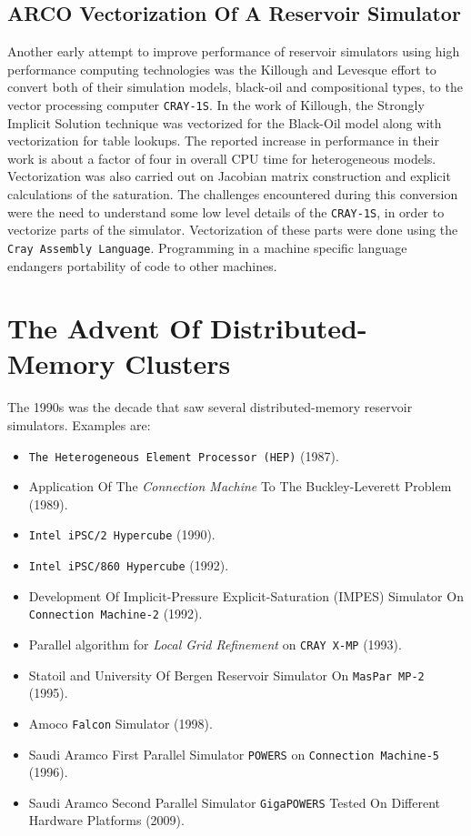 \documentclass[barcolor=BrickRed,nocopyright,nolists]{asmejour}
\begin{document}
\subsection{ARCO Vectorization Of A Reservoir Simulator}
Another early attempt to improve performance of reservoir simulators using high performance computing technologies was the Killough and Levesque\cite{spe10521} effort to convert both of their simulation models, black-oil and compositional types,
to the vector processing computer \texttt{CRAY-1S}. In the work of Killough\cite{spe10521}, the Strongly Implicit Solution technique was vectorized for the Black-Oil model along
with vectorization for table lookups. The reported increase in performance in their work is about a factor of four in overall CPU time for heterogeneous models. Vectorization was also carried out on Jacobian matrix construction and
explicit calculations of the saturation. The challenges encountered during this conversion were the need to understand some low level details of the \texttt{CRAY-1S}, in order to vectorize parts of the simulator. Vectorization of these parts were done
using the \texttt{Cray Assembly Language}. Programming in a machine specific language endangers portability of code to other machines.



\section{The Advent Of Distributed-Memory Clusters}
The 1990s was the decade that saw several distributed-memory reservoir simulators. Examples are:
\begin{itemize}
	\item \texttt{The Heterogeneous Element Processor (HEP)} (1987)\cite{spe16020}.
	\item Application Of The \textit{Connection Machine} To The Buckley-Leverett Problem (1989)\cite{spe19121}.
	\item \texttt{Intel iPSC/2 Hypercube} (1990)\cite{spe19804}.
	\item \texttt{Intel iPSC/860 Hypercube} (1992)\cite{spe21208,spe6830}.
	\item Development Of Implicit-Pressure Explicit-Saturation (IMPES) Simulator On \texttt{Connection Machine-2} (1992)\cite{spe21213}.
	\item Parallel algorithm for \textit{Local Grid Refinement} on \texttt{CRAY X-MP} (1993)\cite{spe25258}.
	\item Statoil and University Of Bergen Reservoir Simulator On \texttt{MasPar MP-2} (1995)\cite{spe29139}.
	\item Amoco \texttt{Falcon} Simulator (1998)\cite{spe51969}.
	\item Saudi Aramco First Parallel Simulator \texttt{POWERS} on \texttt{Connection Machine-5} (1996)\cite{spe51886}.
	\item Saudi Aramco Second Parallel Simulator \texttt{GigaPOWERS} Tested On Different Hardware Platforms (2009)\cite{spe119272}.
\end{itemize}
\end{document}
